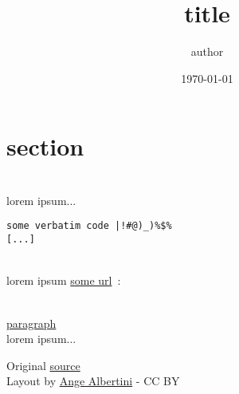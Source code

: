 \documentclass{article}
\title{title}
\author{author}
\date{\today}
\begin{document}

\setmainfont{Beeb} %
\setmonofont{Beeb} %
\color{white}


\font=7pt %

\maketitle

\begin{center}
\end{center}

\color{yellow}\section{section} \color{white}


~\\lorem ipsum...

\color{cyan}

\begin{verbatim}
some verbatim code |!#@)_)%$%
[...]
\end{verbatim}
\color{white}

\newpage

~\\lorem ipsum \href{https://archive.org}{some url}~:\\

\color{cyan}
\color{white}

~\\\underline{paragraph}\\lorem ipsum...

\vspace*{\fill}
\begin{flushright}
\tiny
Original \href{https://corkami.com}{source}\\
Layout by \href{http://twitter.com/angealbertini}{Ange Albertini} - CC BY
\end{flushright}
\end{document}
